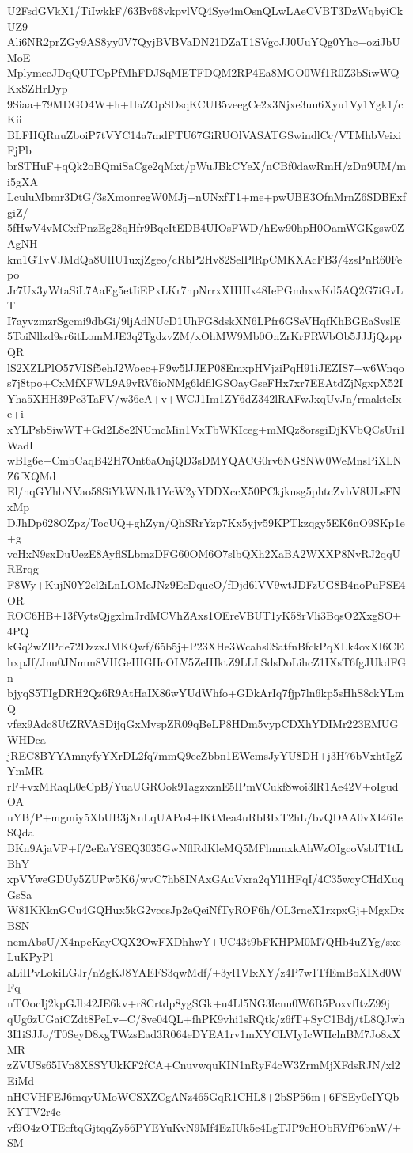 U2FsdGVkX1/TiIwkkF/63Bv68vkpvlVQ4Sye4mOsnQLwLAeCVBT3DzWqbyiCkUZ9
Ali6NR2prZGy9AS8yy0V7QyjBVBVaDN21DZaT1SVgoJJ0UuYQg0Yhc+oziJbUMoE
MplymeeJDqQUTCpPfMhFDJSqMETFDQM2RP4Ea8MGO0Wf1R0Z3bSiwWQKxSZHrDyp
9Siaa+79MDGO4W+h+HaZOpSDsqKCUB5veegCe2x3Njxe3uu6Xyu1Vy1Ygk1/cKii
BLFHQRuuZboiP7tVYC14a7mdFTU67GiRUOlVASATGSwindlCc/VTMhbVeixiFjPb
brSTHuF+qQk2oBQmiSaCge2qMxt/pWuJBkCYeX/nCBf0dawRmH/zDn9UM/mi5gXA
LculuMbmr3DtG/3sXmonregW0MJj+nUNxfT1+me+pwUBE3OfnMrnZ6SDBExfgiZ/
5fHwV4vMCxfPnzEg28qHfr9BqeItEDB4UIOsFWD/hEw90hpH0OamWGKgsw0ZAgNH
km1GTvVJMdQa8UlIU1uxjZgeo/cRbP2Hv82SelPlRpCMKXAcFB3/4zsPnR60Fepo
Jr7Ux3yWtaSiL7AaEg5etIiEPxLKr7npNrrxXHHIx48IePGmhxwKd5AQ2G7iGvLT
I7ayvzmzrSgcmi9dbGi/9ljAdNUcD1UhFG8dskXN6LPfr6GSeVHqfKhBGEaSvslE
5ToiNllzd9sr6itLomMJE3q2TgdzvZM/xOhMW9Mb0OnZrKrFRWbOb5JJJjQzppQR
lS2XZLPlO57VISf5ehJ2Woec+F9w5lJJEP08EmxpHVjziPqH91iJEZIS7+w6Wnqo
s7j8tpo+CxMfXFWL9A9vRV6ioNMg6ldfllGSOayGseFHx7xr7EEAtdZjNgxpX52I
Yha5XHH39Pe3TaFV/w36eA+v+WCJ1Im1ZY6dZ342lRAFwJxqUvJn/rmakteIxe+i
xYLPsbSiwWT+Gd2L8e2NUmcMin1VxTbWKIceg+mMQz8orsgiDjKVbQCsUri1WadI
wBIg6e+CmbCaqB42H7Ont6aOnjQD3sDMYQACG0rv6NG8NW0WeMnsPiXLNZ6fXQMd
El/nqGYhbNVao58SiYkWNdk1YcW2yYDDXccX50PCkjkusg5phtcZvbV8ULsFNxMp
DJhDp628OZpz/TocUQ+ghZyn/QhSRrYzp7Kx5yjv59KPTkzqgy5EK6nO9SKp1e+g
vcHxN9sxDuUezE8AyflSLbmzDFG60OM6O7slbQXh2XaBA2WXXP8NvRJ2qqURErqg
F8Wy+KujN0Y2el2iLnLOMeJNz9EcDqucO/fDjd6lVV9wtJDFzUG8B4noPuPSE4OR
ROC6HB+13fVytsQjgxlmJrdMCVhZAxs1OEreVBUT1yK58rVli3BqsO2XxgSO+4PQ
kGq2wZlPde72DzzxJMKQwf/65b5j+P23XHe3Wcahs0SatfnBfckPqXLk4oxXI6CE
hxpJf/Jnu0JNmm8VHGeHIGHcOLV5ZeIHktZ9LLLSdsDoLihcZ1IXsT6fgJUkdFGn
bjyqS5TIgDRH2Qz6R9AtHaIX86wYUdWhfo+GDkArIq7fjp7ln6kp5sHhS8ckYLmQ
vfex9Adc8UtZRVASDijqGxMvspZR09qBeLP8HDm5vypCDXhYDIMr223EMUGWHDca
jREC8BYYAmnyfyYXrDL2fq7mmQ9ecZbbn1EWcmsJyYU8DH+j3H76bVxhtIgZYmMR
rF+vxMRaqL0eCpB/YuaUGROok91agzxznE5IPmVCukf8woi3lR1Ae42V+oIgudOA
uYB/P+mgmiy5XbUB3jXnLqUAPo4+lKtMea4uRbBIxT2hL/bvQDAA0vXI461eSQda
BKn9AjaVF+f/2eEaYSEQ3035GwNflRdKleMQ5MFlmmxkAhWzOIgcoVsbIT1tLBhY
xpVYweGDUy5ZUPw5K6/wvC7hb8INAxGAuVxra2qYl1HFqI/4C35wcyCHdXuqGsSa
W81KKknGCu4GQHux5kG2vccsJp2eQeiNfTyROF6h/OL3rncX1rxpxGj+MgxDxBSN
nemAbsU/X4npeKayCQX2OwFXDhhwY+UC43t9bFKHPM0M7QHb4uZYg/sxeLuKPyPl
aLiIPvLokiLGJr/nZgKJ8YAEFS3qwMdf/+3yl1VlxXY/z4P7w1TfEmBoXIXd0WFq
nTOocIj2kpGJb42JE6kv+r8Crtdp8ygSGk+u4Ll5NG3Icnu0W6B5PoxvfItzZ99j
qUg6zUGaiCZdt8PeLv+C/8ve04QL+fhPK9vhi1sRQtk/z6fT+SyC1Bdj/tL8QJwh
3I1iSJJo/T0SeyD8xgTWzsEad3R064eDYEA1rv1mXYCLVIyIcWHclnBM7Jo8xXMR
zZVUSs65IVn8X8SYUkKF2fCA+CnuvwquKIN1nRyF4cW3ZrmMjXFdsRJN/xl2EiMd
nHCVHFEJ6mqyUMoWCSXZCgANz465GqR1CHL8+2bSP56m+6FSEy0eIYQbKYTV2r4e
vf9O4zOTEcftqGjtqqZy56PYEYuKvN9Mf4EzIUk5e4LgTJP9cHObRVfP6bnW/+SM
